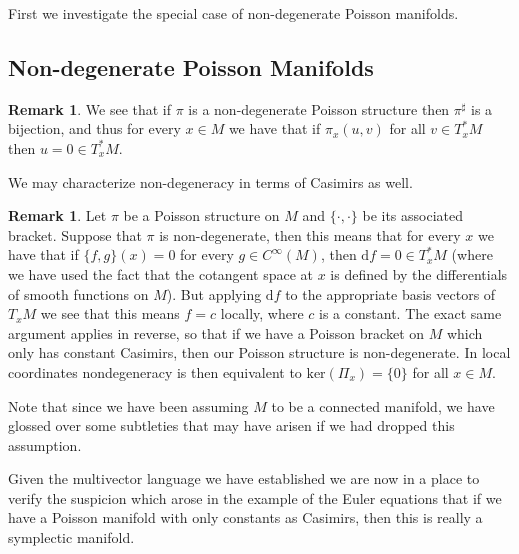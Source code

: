 \documentclass[psamsfonts,12pt]{amsart}
\newcommand\td{\mathrm{d}}
\newcommand\0{\mathbf{0}}
\theoremstyle{plain}
\theoremstyle{definition}
\newtheorem{rmk}[thm]{Remark}
\begin{document}
First we investigate the special case of non-degenerate Poisson manifolds.



\subsection{Non-degenerate Poisson Manifolds}

\begin{rmk}
We see that if $\pi$ is a non-degenerate Poisson structure then $\pi^\sharp$ is a bijection, and thus for every $x\in M$ we have that if $\pi_x(u,v)$ for all $v\in T^*_x M$ then $u=0\in T^*_x M$.
\end{rmk}

We may characterize non-degeneracy in terms of Casimirs as well.

\begin{rmk}
Let $\pi$ be a Poisson structure on $M$ and $\{\cdot, \cdot \}$ be its associated bracket.  Suppose that $\pi$ is non-degenerate, then this means that for every $x$ we have that if $\{f,g\}(x)=0$ for every $g\in C^\infty(M)$, then $\td f =0 \in T_x^*M$ (where we have used the fact that the cotangent space at $x$ is defined by the differentials of smooth functions on $M$).  But applying $\td f$ to the appropriate basis vectors of $T_xM$ we see that this means $f=c$ locally, where $c$ is a constant.  The exact same argument applies in reverse, so that if we have a Poisson bracket on $M$ which only has constant Casimirs, then our Poisson structure is non-degenerate.  In local coordinates nondegeneracy is then equivalent to $\text{ker}(\Pi_x)=\{0\}$ for all $x\in M$.
\end{rmk}

Note that since we have been assuming $M$ to be a connected manifold, we have glossed over some subtleties that may have arisen if we had dropped this assumption.

Given the multivector language we have established we are now in a place to verify the suspicion which arose in the example of the Euler equations that if we have a Poisson manifold with only constants as Casimirs, then this is really a symplectic manifold.
\end{document}
